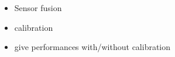 
\begin{itemize}
    \item Sensor fusion
    \item calibration
    \item give performances with/without calibration
\end{itemize}